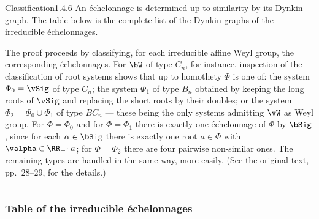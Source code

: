 \documentclass[12pt,a4paper,oneside,english]{smfart}
\makeatletter
\newcommand{\btanchor}[1]{\leavevmode\Hy@raisedlink{\hypertarget{bt:#1}{}}}
\newcommand{\btsecC}[2]{%
  \par\needspace{3\baselineskip}\phantomsection
  \subsubsection*{#2}%
  \ifx\relax#1\relax\else\btanchor{#1}\fi}
\theoremstyle{definition}
\theoremstyle{bt}
\makeatother
\begin{document}
\begin{BT}{Classification}{1.4.6}\btanchor{1.4.6}
An \'echelonnage is determined up to similarity by its Dynkin graph.  The
table below is the complete list of the Dynkin graphs of the irreducible
\'echelonnages.
\end{BT}

\noindent
The proof proceeds by classifying, for each irreducible affine Weyl group,
the corresponding \'echelonnages.  For $\bW$ of type $C_n$, for instance,
inspection of the classification of root systems shows that up to homothety
$\Phi$ is one of: the system $\Phi_0=\vSig$ of type $C_n$; the system
$\Phi_1$ of type $B_n$ obtained by keeping the long roots of $\vSig$ and
replacing the short roots by their doubles; or the system
$\Phi_2=\Phi_0\cup\Phi_1$ of type $BC_n$ --- these being the only systems
admitting $\vW$ as Weyl group.  For $\Phi=\Phi_0$ and for $\Phi=\Phi_1$ there
is exactly one \'echelonnage of $\Phi$ by $\bSig$, since for each
$\alpha\in\bSig$ there is exactly one root $a\in\Phi$ with
$\valpha\in\RR_{+}\!\cdot a$; for $\Phi=\Phi_2$ there are four pairwise
non-similar ones.  The remaining types are handled in the same way, more
easily.  (See the original text, pp.~28--29, for the details.)

\bigskip
\hrule
\bigskip

\btsecC{}{Table of the irreducible \'echelonnages}
\end{document}

